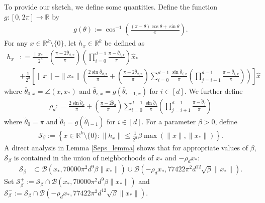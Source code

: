 \documentclass[11pt]{article}
\newcommand{\R}{\mathbb{R}}
\newcommand{\Seps}{\mathcal{S}}
\theoremstyle{remark}
\begin{document}
To provide our sketch, we define some quantities. Define the function $g : [0,2\pi] \rightarrow \R$ by \begin{align}
    g(\theta) := \cos^{-1}\left(\frac{(\pi-\theta)\cos\theta + \sin\theta}{\pi}\right) .\label{gdef}
\end{align} For any $x \in \R^k \setminus \{0\}$, let $h_x \in \R^k$ be defined as \begin{align*}
h_{x} & : =  \frac{\|x_*\|}{2^d}\left(\frac{\pi - 2\overline{\theta}_{d,x}}{\pi}\right)\left(\prod_{i=0}^{d-1}\frac{\pi - \overline{\theta}_{i,x}}{\pi}\right)\hat{x}_* \\
& + \frac{1}{2^d}\left[\|x\| - \|x_*\|\left( \frac{2\sin \overline{\theta}_{d,x}}{\pi} + \left(\frac{\pi - 2\overline{\theta}_{d,x}}{\pi}\right) \sum_{i=0}^{d-1} \frac{\sin \overline{\theta}_{i,x}}{\pi}\left(\prod_{j=i+1}^{d-1} \frac{\pi - \overline{\theta}_{i,x}}{\pi}\right)\right)\right]\hat{x}
\end{align*} where $\overline{\theta}_{0,x} = \angle(x,x_*)$ and $\overline{\theta}_{i,x} = g(\overline{\theta}_{i-1,x})$ for $i \in [d]$. We further define \begin{align*}
\rho_d : = \frac{2 \sin \breve{\theta}_d}{\pi} + \left(\frac{\pi - 2 \breve{\theta}_d}{\pi}\right) \sum_{i=0}^{d-1}\frac{\sin \breve{\theta}_i}{\pi} \left(\prod_{j=i+1}^{d-1} \frac{\pi - \breve{\theta}_j}{\pi}\right)
\end{align*} where $\breve{\theta}_0 = \pi$ and $\breve{\theta}_i = g(\breve{\theta}_{i-1})$ for $i \in [d]$. For a parameter $\beta > 0$, define \begin{align}
    \Seps_{\beta} := \left\{x \in \R^k \setminus \{0\} : \|h_x\| \leqslant \frac{1}{2^d}\beta\max(\|x\|,\|x_*\|)\right\}. \label{Sbeta_def}
\end{align} A direct analysis in Lemma \ref{Seps_lemma} shows that for appropriate values of $\beta$, $\mathcal{S}_{\beta}$ is contained in the union of neighborhoods of $x_*$ and $-\rho_d x_*$: \begin{align*}
    \Seps_{\beta} & \subset  \mathcal{B}(x_*,70000\pi^2 d^9\beta\|x_*\|) \cup \mathcal{B}(-\rho_d x_*, 77422\pi^2d^{12}\sqrt{\beta}\|x_*\|). %
\end{align*} Set $\Seps_{\beta}^+:= \Seps_{\beta} \cap \mathcal{B}(x_*,70000\pi^2 d^9\beta\|x_*\|)$ and $\Seps_{\beta}^{-}:= \Seps_{\beta} \cap \mathcal{B}(-\rho_d x_*, 77422\pi^2d^{12}\sqrt{\beta}\|x_*\|).$
\end{document}
